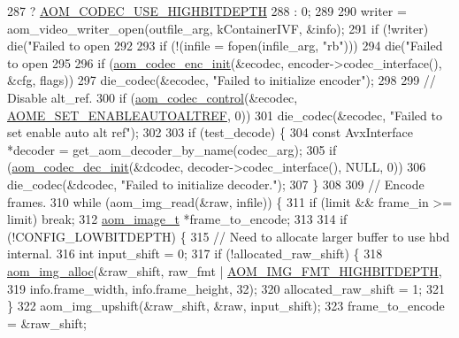 \begin{DoxyCodeInclude}
{{{{{{{{287                ? \hyperlink{group__encoder_gae30bbbdef18e9da3631b69c170533e92}{AOM\_CODEC\_USE\_HIGHBITDEPTH}
288                : 0;
289 
290   writer = aom\_video\_writer\_open(outfile\_arg, kContainerIVF, &info);
291   \textcolor{keywordflow}{if} (!writer) die(\textcolor{stringliteral}{"Failed to open %
292 
293   \textcolor{keywordflow}{if} (!(infile = fopen(infile\_arg, \textcolor{stringliteral}{"rb"})))
294     die(\textcolor{stringliteral}{"Failed to open %
295 
296   \textcolor{keywordflow}{if} (\hyperlink{group__encoder_gaade68a7d33d30f97dc9a596aa5e065d8}{aom\_codec\_enc\_init}(&ecodec, encoder->codec\_interface(), &cfg, flags))
297     die\_codec(&ecodec, \textcolor{stringliteral}{"Failed to initialize encoder"});
298 
299   \textcolor{comment}{// Disable alt\_ref.}
300   \textcolor{keywordflow}{if} (\hyperlink{group__codec_ga6da974f4eeaba1fa74106b28d0fe6ac5}{aom\_codec\_control}(&ecodec, \hyperlink{group__aom__encoder_ggae78dde67a6d78f332e9bdba0dde42db5ac8a24393f214823f5a6bd345afb840b6}{AOME\_SET\_ENABLEAUTOALTREF}, 0))
301     die\_codec(&ecodec, \textcolor{stringliteral}{"Failed to set enable auto alt ref"});
302 
303   \textcolor{keywordflow}{if} (test\_decode) \{
304     \textcolor{keyword}{const} AvxInterface *decoder = get\_aom\_decoder\_by\_name(codec\_arg);
305     \textcolor{keywordflow}{if} (\hyperlink{group__decoder_gafdbfca65b19ab1f6d72b32cd01753b9b}{aom\_codec\_dec\_init}(&dcodec, decoder->codec\_interface(), NULL, 0))
306       die\_codec(&dcodec, \textcolor{stringliteral}{"Failed to initialize decoder."});
307   \}
308 
309   \textcolor{comment}{// Encode frames.}
310   \textcolor{keywordflow}{while} (aom\_img\_read(&raw, infile)) \{
311     \textcolor{keywordflow}{if} (limit && frame\_in >= limit) \textcolor{keywordflow}{break};
312     \hyperlink{structaom__image}{aom\_image\_t} *frame\_to\_encode;
313 
314     \textcolor{keywordflow}{if} (!CONFIG\_LOWBITDEPTH) \{
315       \textcolor{comment}{// Need to allocate larger buffer to use hbd internal.}
316       \textcolor{keywordtype}{int} input\_shift = 0;
317       \textcolor{keywordflow}{if} (!allocated\_raw\_shift) \{
318         \hyperlink{aom__image_8h_a570db29fbd122951235a08fe9375f6bb}{aom\_img\_alloc}(&raw\_shift, raw\_fmt | 
      \hyperlink{aom__image_8h_a607b37d91f75442f54223ecd85f1b6cb}{AOM\_IMG\_FMT\_HIGHBITDEPTH},
319                       info.frame\_width, info.frame\_height, 32);
320         allocated\_raw\_shift = 1;
321       \}
322       aom\_img\_upshift(&raw\_shift, &raw, input\_shift);
323       frame\_to\_encode = &raw\_shift;
}}}}}}}}}}
\end{DoxyCodeInclude}
